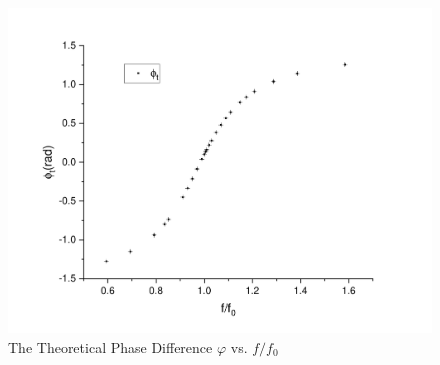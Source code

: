 \documentclass{my_template}
\renewcommand{\phi}{\varphi}
\begin{document}
    \begin{figure}[H]
        \centering
        \includegraphics[width=\textwidth]{fig/phit.pdf}
        \caption{The Theoretical Phase Difference $\phi$ vs. $f/f_0$}
        \label{fig:phit}
    \end{figure}
\end{document}
